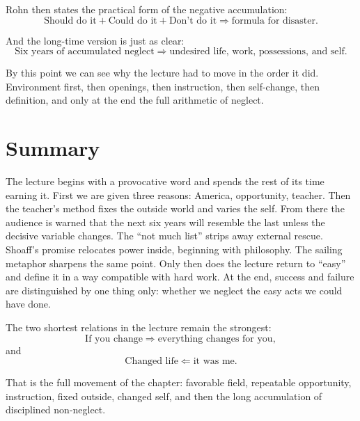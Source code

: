 Rohn then states the practical form of the negative accumulation:
\begin{equation}
\text{Should do it}+\text{Could do it}+\text{Don't do it}
\Longrightarrow
\text{formula for disaster}.
\end{equation}

And the long-time version is just as clear:
\begin{equation}
\text{Six years of accumulated neglect}
\Longrightarrow
\text{undesired life, work, possessions, and self}.
\end{equation}

By this point we can see why the lecture had to move in the order it did. Environment first, then openings, then instruction, then self-change, then definition, and only at the end the full arithmetic of neglect.

\section{Summary}

The lecture begins with a provocative word and spends the rest of its time earning it. First we are given three reasons: America, opportunity, teacher. Then the teacher's method fixes the outside world and varies the self. From there the audience is warned that the next six years will resemble the last unless the decisive variable changes. The ``not much list'' strips away external rescue. Shoaff's promise relocates power inside, beginning with philosophy. The sailing metaphor sharpens the same point. Only then does the lecture return to ``easy'' and define it in a way compatible with hard work. At the end, success and failure are distinguished by one thing only: whether we neglect the easy acts we could have done.

The two shortest relations in the lecture remain the strongest:
\begin{equation}
\text{If you change} \Longrightarrow \text{everything changes for you},
\end{equation}
and
\begin{equation}
\text{Changed life} \Longleftarrow \text{it was me}.
\end{equation}

That is the full movement of the chapter: favorable field, repeatable opportunity, instruction, fixed outside, changed self, and then the long accumulation of disciplined non-neglect.